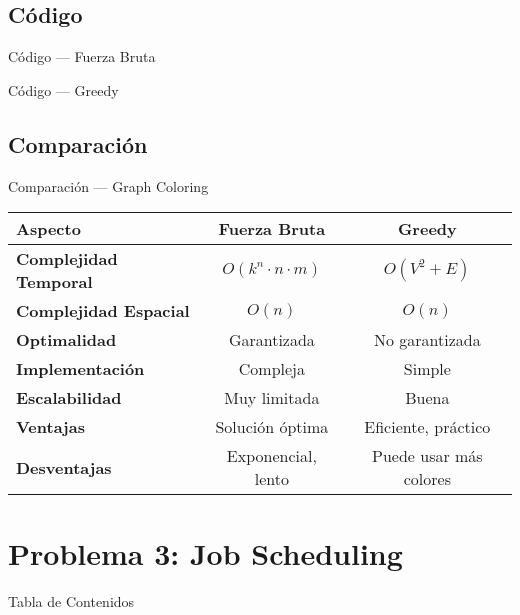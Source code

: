 \documentclass[aspectratio=169]{beamer}
\begin{document}
\subsection{Código}
\begin{frame}{Código — Fuerza Bruta}
\end{frame}

\begin{frame}{Código — Greedy}
\end{frame}

\subsection{Comparación}
\begin{frame}{Comparación — Graph Coloring}
  \begin{table}[h]
  \centering
  \begin{tabular}{|l|c|c|}
  \hline
  \textbf{Aspecto} & \textbf{Fuerza Bruta} & \textbf{Greedy} \\
  \hline
  \textbf{Complejidad Temporal} & $O(k^n \cdot n \cdot m)$ & $O(V^2 + E)$ \\
  \textbf{Complejidad Espacial} & $O(n)$ & $O(n)$ \\
  \textbf{Optimalidad} & Garantizada & No garantizada \\
  \textbf{Implementación} & Compleja & Simple \\
  \textbf{Escalabilidad} & Muy limitada & Buena \\
  \hline
  \textbf{Ventajas} & Solución óptima & Eficiente, práctico \\
  \textbf{Desventajas} & Exponencial, lento & Puede usar más colores \\
  \hline
  \end{tabular}
  \end{table}
\end{frame}

\section{Problema 3: Job Scheduling}
\begin{frame}{Tabla de Contenidos}
\end{frame}
\end{document}
